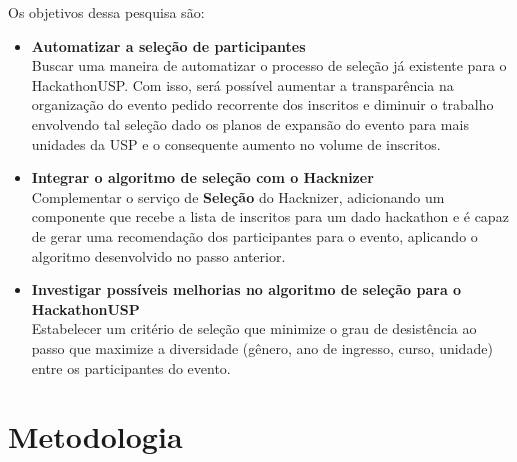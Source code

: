 \documentclass[10pt,twoside,a4paper]{article}
\begin{document}
    Os objetivos dessa pesquisa são:
    \begin{itemize}
        \item \textbf{Automatizar a seleção de participantes}\\
          Buscar uma maneira de automatizar o processo de seleção já existente para o HackathonUSP. Com isso, será possível aumentar a transparência na organização do evento \textemdash pedido recorrente dos inscritos e diminuir o trabalho envolvendo tal seleção \textemdash dado os planos de expansão do evento para mais unidades da USP e o consequente aumento no volume de inscritos.
        
        \item \textbf{Integrar o algoritmo de seleção com o Hacknizer}\\
          Complementar o serviço de \textbf{Seleção} do Hacknizer, adicionando um componente que recebe a lista de inscritos para um dado hackathon e é capaz de gerar uma recomendação dos participantes para o evento, aplicando o algoritmo desenvolvido no passo anterior.
        
        \item \textbf{Investigar possíveis melhorias no algoritmo de seleção para o HackathonUSP}\\
          Estabelecer um critério de seleção que minimize o grau de desistência ao passo que maximize a diversidade (gênero, ano de ingresso, curso, unidade) entre os participantes do evento.
    \end{itemize}
    
    
\section{Metodologia}
      
\end{document}
